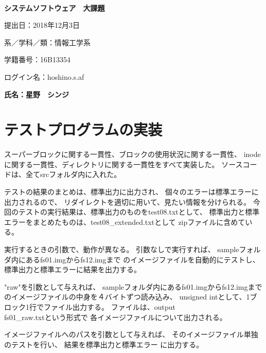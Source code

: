 \documentclass[a4j,11pt]{jarticle}
\begin{document}
\begin{center}
　\vspace{10mm}

{\bf {\huge システムソフトウェア　大課題}}

\vspace{80mm}

提出日：2018年12月3日

\vspace{10mm}

系／学科／類：情報工学系

\vspace{10mm}

学籍番号：16B13354

\vspace{10mm}

ログイン名：hoshino.s.af

\vspace{20mm}

{\bf {\LARGE 氏名：星野　シンジ}}
\end{center}

\newpage

\section{テストプログラムの実装}

スーパーブロックに関する一貫性、ブロックの使用状況に関する一貫性、
inodeに関する一貫性、ディレクトリに関する一貫性をすべて実装した。
ソースコードは、全てsrcフォルダ内に入れた。

テストの結果のまとめは、標準出力に出力され、
個々のエラーは標準エラーに出力されるので、
リダイレクトを適切に用いて、見たい情報を分けられる。
今回のテストの実行結果は、標準出力のものをtest08.txtとして、
標準出力と標準エラーをまとめたものは、test08\_extended.txtとして
zipファイルに含めている。

実行するときの引数で、動作が異なる。
引数なしで実行すれば、
sampleフォルダ内にあるfs01.imgからfs12.imgまで
のイメージファイルを自動的にテストし、
標準出力と標準エラーに結果を出力する。

"raw"を引数として与えれば、
sampleフォルダ内にあるfs01.imgからfs12.imgまで
のイメージファイルの中身を４バイトずつ読み込み、
unsigned intとして、1ブロック1行でファイル出力する。
ファイルは、output\\fs01\_raw.txtという形式で
各イメージファイルについて出力される。

イメージファイルへのパスを引数として与えれば、
そのイメージファイル単独のテストを行い、
結果を標準出力と標準エラー
に出力する。
\end{document}
